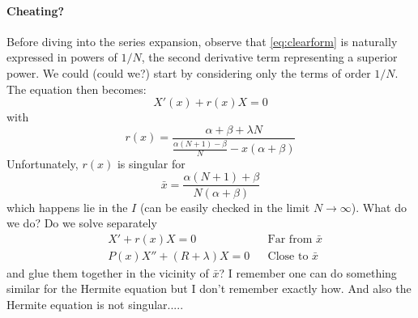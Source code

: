 \documentclass{article}
\newcommand{\red}[1]{{\color{red}#1}}
\begin{document}
	\paragraph{Cheating?} Before diving into the series expansion, observe that
	\eqref{eq:clearform} is naturally expressed in powers of $1/N$, the second
	derivative term representing a superior power. We could \red{(could we?)} start
	by considering only the terms of order $1/N$. The equation then becomes:
	\begin{equation}
		X'(x) + r(x) X = 0
	\end{equation}
	with
	\begin{equation*}
		r(x) = \frac{\alpha + \beta + \lambda N}{\frac{\alpha(N+1)-\beta}{N} -
		x(\alpha + \beta)}
	\end{equation*}
	Unfortunately, $r(x)$ is singular for
	\begin{equation*}
		\bar{x} = \frac{\alpha(N+1) + \beta}{N(\alpha + \beta)}
	\end{equation*}
	which happens lie in the $I$ (can be easily checked in the limit $N \to
	\infty$). 
	\red{What do we do? Do we solve separately
		\begin{align*}
			&X' + r(x) X = 0 &&\text{Far from $\bar{x}$}\\
			&P(x) X'' + (R+\lambda) X = 0 && \text{Close to $\bar{x}$}
		\end{align*}
	and glue them together in the vicinity of $\bar{x}$? I remember one can do
	something similar for the Hermite equation but I don't remember exactly how.
	And also the Hermite equation is not singular.....
	}
\end{document}

